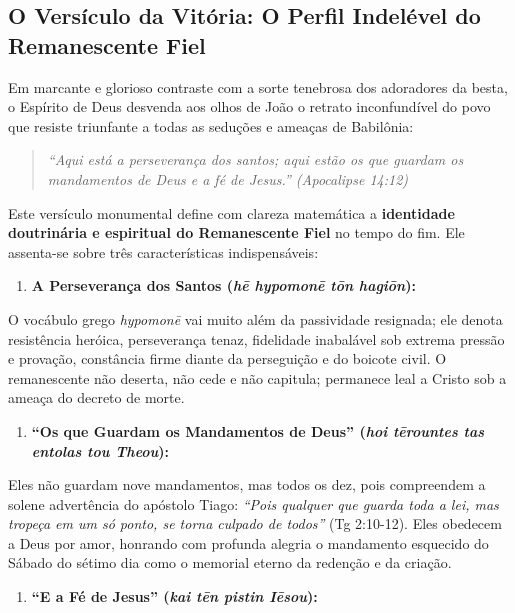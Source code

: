\subsection{O Versículo da Vitória: O Perfil Indelével do Remanescente Fiel}


Em marcante e glorioso contraste com a sorte tenebrosa dos adoradores da besta, o Espírito de Deus desvenda aos olhos de João o retrato inconfundível do povo que resiste triunfante a todas as seduções e ameaças de Babilônia:


\begin{quote}
\itshape \textit{``Aqui está a perseverança dos santos; aqui estão os que guardam os mandamentos de Deus e a fé de Jesus.''} (Apocalipse 14:12)
\end{quote}


Este versículo monumental define com clareza matemática a \textbf{identidade doutrinária e espiritual do Remanescente Fiel} no tempo do fim. Ele assenta-se sobre três características indispensáveis:

\begin{enumerate}
  \item \textbf{A Perseverança dos Santos (\textit{hē hypomonē tōn hagiōn}):}
\end{enumerate}

O vocábulo grego \textit{hypomonē} vai muito além da passividade resignada; ele denota resistência heróica, perseverança tenaz, fidelidade inabalável sob extrema pressão e provação, constância firme diante da perseguição e do boicote civil. O remanescente não deserta, não cede e não capitula; permanece leal a Cristo sob a ameaça do decreto de morte.
\begin{enumerate}
  \item \textbf{``Os que Guardam os Mandamentos de Deus'' (\textit{hoi tērountes tas entolas tou Theou}):}
\end{enumerate}

Eles não guardam nove mandamentos, mas todos os dez, pois compreendem a solene advertência do apóstolo Tiago: \textit{``Pois qualquer que guarda toda a lei, mas tropeça em um só ponto, se torna culpado de todos''} (Tg 2:10-12). Eles obedecem a Deus por amor, honrando com profunda alegria o mandamento esquecido do Sábado do sétimo dia como o memorial eterno da redenção e da criação.
\begin{enumerate}
  \item \textbf{``E a Fé de Jesus'' (\textit{kai tēn pistin Iēsou}):}
\end{enumerate}

